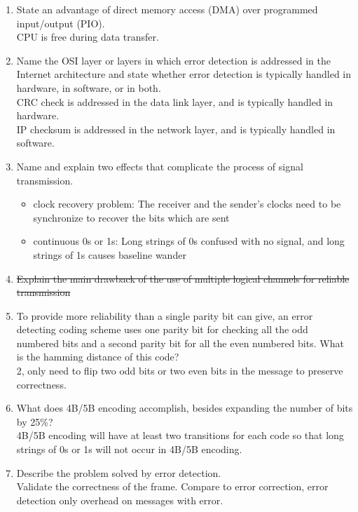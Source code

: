 \documentclass[10pt, a4paper]{article}
\begin{document}
\begin{enumerate}
\item\mbox{}State an advantage of direct memory access (DMA) over programmed input/output (PIO).\\
    \color{blue}
    CPU is free during data transfer.
    \color{black}
\item\mbox{}Name the OSI layer or layers in which error detection is addressed in the Internet architecture and state whether error detection is typically handled in hardware, in software, or in both.\\
    \color{blue}
    CRC check is addressed in the data link layer, and is typically handled in hardware.\\
    IP checksum is addressed in the network layer, and is typically handled in software.
    \color{black}
\item\mbox{}Name and explain two effects that complicate the process of signal transmission.
    \color{blue}
    \begin{itemize}
        \item clock recovery problem: The receiver and the sender's clocks need to be synchronize to recover the bits which are sent
    \item continuous 0s or 1s: Long strings of 0s confused with no signal, and long strings of 1s causes baseline wander
    \end{itemize}
    \color{black}
\item\mbox{} \sout{Explain the main drawback of the use of multiple logical channels for reliable transmission}
\item\mbox{}To provide more reliability than a single parity bit can give, an error detecting coding scheme uses one parity bit for checking all the odd numbered bits and a second parity bit for all the even numbered bits. What is the hamming distance of this code?\\
    \color{blue}
    2, only need to flip two odd bits or two even bits in the message to preserve correctness.
    \color{black}
\item\mbox{} What does 4B/5B encoding accomplish, besides expanding the number of bits by 25\%?\\
    \color{blue}
    4B/5B encoding will have at least two transitions for each code so that long strings of 0s or 1s will not occur in 4B/5B encoding.
    \color{black}
\item\mbox{}Describe the problem solved by error detection.\\
    \color{blue}
    Validate the correctness of the frame. Compare to error correction, error detection only overhead on messages with error.

\end{enumerate}
\end{document}
